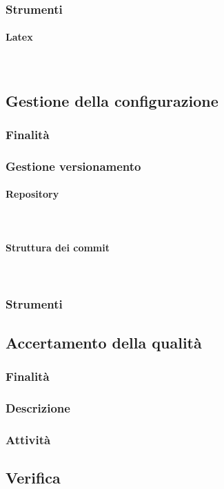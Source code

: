 \documentclass[../norme-di-progetto.tex]{subfiles}
\begin{document}
\subsubsection{Strumenti}
\paragraph {Latex}\mbox{}\\
\subsection{Gestione della configurazione}
\subsubsection{Finalità}
\subsubsection{Gestione versionamento}
\paragraph{Repository}\mbox{}\\
\paragraph{Struttura dei commit}\mbox{}\\
\subsubsection{Strumenti}
\subsection{Accertamento della qualità}
\subsubsection{Finalità}
\subsubsection{Descrizione}
\subsubsection{Attività}
\subsection{Verifica}
\end{document}
